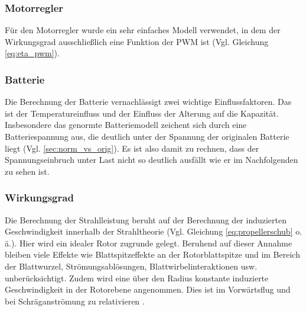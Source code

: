 \subsubsection{Motorregler}
Für den Motorregler wurde ein sehr einfaches Modell verwendet, in dem der Wirkungsgrad ausschließlich eine Funktion der PWM ist (Vgl. Gleichung \ref{eq:eta_pwm}).

\subsubsection{Batterie}
Die Berechnung der Batterie vernachlässigt zwei wichtige Einflussfaktoren. Das ist der Temperatureinfluss und der Einfluss der Alterung auf die Kapazität. Insbesondere das genormte Batteriemodell zeichent sich durch eine Batteriespannung aus, die deutlich unter der Spannung der originalen Batterie liegt (Vgl. \ref{sec:norm_vs_orig}). Es ist also damit zu rechnen, dass der Spannungseinbruch unter Last nicht so deutlich ausfällt wie er im Nachfolgenden zu sehen ist.\\


\subsubsection{Wirkungsgrad}
Die Berechnung der Strahlleistung beruht auf der Berechnung der induzierten Geschwindigkeit innerhalb der Strahltheorie (Vgl. Gleichung \ref{eq:propellerschub} o. ä.). Hier wird ein idealer Rotor zugrunde gelegt.
Beruhend auf dieser Annahme bleiben viele Effekte wie Blattspitzeffekte an der Rotorblattspitze und im Bereich der Blattwurzel, Strömungsablösungen, Blattwirbelinteraktionen usw. unberücksichtigt.  Zudem wird eine über den Radius konstante induzierte Geschwindigkeit in der Rotorebene angenommen. Dies ist im Vorwärtsflug und bei Schräganströmung zu relativieren \cite[S.226]{Wall.2015}.

